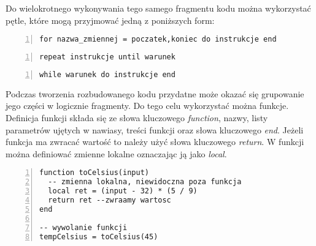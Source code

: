 Do wielokrotnego wykonywania tego samego fragmentu kodu można wykorzystać pętle,
które mogą przyjmować jedną z poniższych form:
{
\small
\begin{lstlisting}[numbers=left,frame=single,numberstyle=\tiny,backgroundcolor=\color{code_back},breaklines=true]
for nazwa_zmiennej = poczatek,koniec do instrukcje end
\end{lstlisting}
}
{
\small
\begin{lstlisting}[numbers=left,frame=single,numberstyle=\tiny,backgroundcolor=\color{code_back},breaklines=true]
repeat instrukcje until warunek
\end{lstlisting}
}
{
\small
\begin{lstlisting}[numbers=left,frame=single,numberstyle=\tiny,backgroundcolor=\color{code_back},breaklines=true]
while warunek do instrukcje end
\end{lstlisting}
}


Podczas tworzenia rozbudowanego kodu przydatne może okazać się grupowanie jego
części w logicznie fragmenty. Do tego celu wykorzystać można funkcje.
Definicja funkcji składa się ze słowa kluczowego \emph{function}, nazwy, listy
parametrów ujętych w nawiasy, treści funkcji oraz słowa kluczowego \emph{end}.
Jeżeli funkcja ma zwracać wartość to należy użyć słowa kluczowego \emph{return}.
W funkcji można definiować zmienne lokalne oznaczając ją jako \emph{local}.

{
\small
\begin{lstlisting}[numbers=left,frame=single,numberstyle=\tiny,backgroundcolor=\color{code_back},breaklines=true]
function toCelsius(input)
  -- zmienna lokalna, niewidoczna poza funkcja
  local ret = (input - 32) * (5 / 9) 
  return ret --zwraamy wartosc
end

-- wywolanie funkcji
tempCelsius = toCelsius(45)
\end{lstlisting}
}